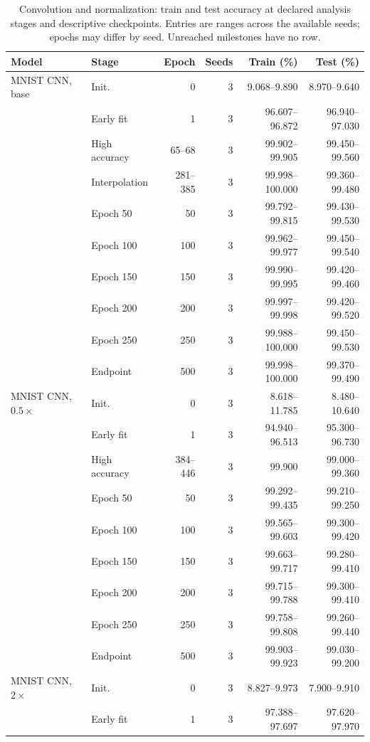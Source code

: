 \FloatBarrier
\begin{table}[!htbp]\centering
\caption{Convolution and normalization: train and test accuracy at declared analysis stages and descriptive checkpoints. Entries are ranges across the available seeds; epochs may differ by seed. Unreached milestones have no row.}\label{tab:perf-2-0}
\small\setlength{\tabcolsep}{4pt}
\begin{tabular}{llrrrr}\toprule
Model & Stage & Epoch & Seeds & Train (\%) & Test (\%)\\\midrule
MNIST CNN, base & Init. & 0 & 3 & 9.068--9.890 & 8.970--9.640\\
 & Early fit & 1 & 3 & 96.607--96.872 & 96.940--97.030\\
 & High accuracy & 65--68 & 3 & 99.902--99.905 & 99.450--99.560\\
 & Interpolation & 281--385 & 3 & 99.998--100.000 & 99.360--99.480\\
 & Epoch 50 & 50 & 3 & 99.792--99.815 & 99.430--99.530\\
 & Epoch 100 & 100 & 3 & 99.962--99.977 & 99.450--99.540\\
 & Epoch 150 & 150 & 3 & 99.990--99.995 & 99.420--99.460\\
 & Epoch 200 & 200 & 3 & 99.997--99.998 & 99.420--99.520\\
 & Epoch 250 & 250 & 3 & 99.988--100.000 & 99.450--99.530\\
 & Endpoint & 500 & 3 & 99.998--100.000 & 99.370--99.490\\
\midrule
MNIST CNN, $0.5\times$ & Init. & 0 & 3 & 8.618--11.785 & 8.480--10.640\\
 & Early fit & 1 & 3 & 94.940--96.513 & 95.300--96.730\\
 & High accuracy & 384--446 & 3 & 99.900 & 99.000--99.360\\
 & Epoch 50 & 50 & 3 & 99.292--99.435 & 99.210--99.250\\
 & Epoch 100 & 100 & 3 & 99.565--99.603 & 99.300--99.420\\
 & Epoch 150 & 150 & 3 & 99.663--99.717 & 99.280--99.410\\
 & Epoch 200 & 200 & 3 & 99.715--99.788 & 99.300--99.410\\
 & Epoch 250 & 250 & 3 & 99.758--99.808 & 99.260--99.440\\
 & Endpoint & 500 & 3 & 99.903--99.923 & 99.030--99.200\\
\midrule
MNIST CNN, $2\times$ & Init. & 0 & 3 & 8.827--9.973 & 7.900--9.910\\
 & Early fit & 1 & 3 & 97.388--97.697 & 97.620--97.970\\

\end{tabular}
\end{table}
